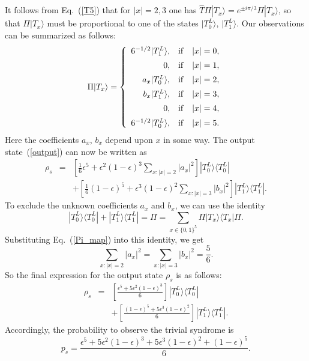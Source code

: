 \documentclass[pra,twocolumn,showpacs]{revtex4}
\newcommand{\la}{\langle}
\newcommand{\ra}{\rangle}
\newcommand{\ep}{\epsilon}
\newcommand{\nn}{\nonumber}
\newcommand{\ba}{\begin{array}}
\newcommand{\ea}{\end{array}}
\begin{document}
It follows from Eq.~(\ref{T5}) that
for $|x|=2,3$ one has $\hat{T}\Pi |T_x\ra = e^{\pm i \pi/3}
\Pi |T_x\ra$, so that $\Pi |T_x\ra$ must be proportional to one of the states
$|T_0^L\ra$, $|T_1^L\ra$. Our observations can be summarized as follows:
\begin{equation}
\label{Pi_map}
\Pi |T_x\ra = \left\{
\ba{rcl}
6^{-1/2} |T_1^L\ra,& {\rm if} & |x| =0,\\[5pt]
0, & {\rm if} & |x|=1, \\[5pt]
a_x |T_0^L\ra, & {\rm if} & |x|=2, \\[5pt]
b_x |T_1^L\ra, & {\rm if} & |x|=3, \\[5pt]
0, & {\rm if} & |x|=4, \\[5pt]
6^{-1/2} |T_0^L\ra,& {\rm if} & |x| =5.
\ea
\right.
\end{equation}
Here the coefficients $a_x$, $b_x$ depend upon $x$ in some way.  The output
state~(\ref{output}) can now be written as
\begin{eqnarray}
\label{output1}
\rho_s &=& 
 \left[ \frac16 \ep^5 + \ep^2 (1-\ep)^3  \sum_{x : |x|=2} |a_x|^2 \right]
|T_0^L\ra\la T_0^L|  \\ 
&& + 
 \left[ \frac16 (1- \ep)^5  + \ep^3 (1-\ep)^2  \sum_{x : |x|=3} |b_x|^2 \right]
|T_1^L\ra\la T_1^L|.\nn
\end{eqnarray}
To exclude the unknown coefficients $a_x$ and $b_x$, we can use the identity 
\[
|T_0^L\ra\la T_0^L| + |T_1^L\ra\la T_1^L| = \Pi = 
\sum_{x\in \{0,1\}^5}\! \Pi |T_x\ra\la T_x| \Pi.
\]
Substituting Eq.~(\ref{Pi_map}) into this identity, we get
\[
\sum_{x : |x|=2} |a_x|^2 = \sum_{x : |x|=3} |b_x|^2 = \frac56.
\]
So the final expression for the output state $\rho_s$ is as follows: 
\begin{eqnarray}
\label{output2}
\rho_s &=& 
\left[\frac{\ep^5 + 5\ep^2 (1-\ep)^3}6\right]|T_0^L\ra\la T_0^L| \nn \\
&&+ 
\left[\frac{(1-\ep)^5 + 5\ep^3(1-\ep)^2}6\right] |T_1^L\ra\la T_1^L|. 
\end{eqnarray}
Accordingly, the probability to observe the trivial syndrome is
\begin{equation}
p_s = \frac{\ep^5 + 5\ep^2 (1-\ep)^3 + 5\ep^3(1-\ep)^2 + (1-\ep)^5}{6}.
\end{equation}
\end{document}
